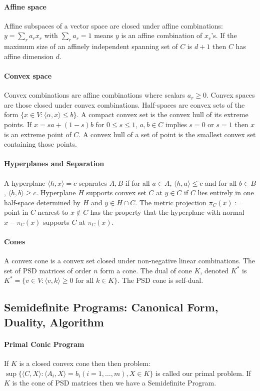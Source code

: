 \documentclass[letterpaper,11pt,oneside,onecolumn]{article}
\begin{document}
\paragraph{Affine space} Affine subspaces of a vector space are closed under affine combinations: $y = \sum_r a_r x_r$ with $\sum_r a_r =1$ means $y$ is an affine combination of $x_r$'s. If the maximum size of an affinely independent spanning set of $C$ is $d+1$ then $C$ has affine dimension $d$.
\paragraph{Convex space} Convex combinations are affine combinations where scalars $a_r \geq 0$. Convex spaces are those closed under convex combinations. Half-spaces are convex sets of the form $\{x \in V: \langle \alpha, x \rangle \leq b\}$. A compact convex set is the convex hull of its extreme points. If $x = sa + (1-s)b$ for $0\leq s \leq 1$, $a,b \in C$ implies $s=0$ or $s=1$ then $x$ is an extreme point of $C$. A convex hull of a set of point is the smallest convex set containing those points.
\paragraph{Hyperplanes and Separation}
A hyperplane $\langle h, x\rangle = c$ separates $A,B$ if for all $a \in A$, $\langle h, a\rangle \leq c$ and for all $b \in B$, $\langle h, b \rangle \geq c$. Hyperplane $H$ supports convex set $C$ at $y \in C$ if $C$ lies entirely in one half-space determined by $H$ and $y \in H \cap C$. The metric projection $\pi_C(x) :=$ point in $C$ nearest to $x \not\in C$ has the property that the hyperplane with normal $x - \pi_C(x)$ supports $C$ at $\pi_C(x)$.
\paragraph{Cones} A convex cone is a convex set closed under non-negative linear combinations. The set of PSD matrices of order $n$ form a cone. The dual of cone $K$, denoted $K^*$ is $K^*=\{v \in V: \langle v,k \rangle \geq 0 \text{ for all } k \in K \}$. The PSD cone is self-dual.
\subsection*{Semidefinite Programs: Canonical Form, Duality, Algorithm}
\paragraph{Primal Conic Program} If $K$ is a closed convex cone then then problem:
$\sup \{\langle C, X \rangle : \langle A_i, X \rangle = b_i (i=1,\dots, m), X \in K \} $ is called our primal problem. If $K$ is the cone of PSD matrices then we have a Semidefinite Program.
\end{document}
